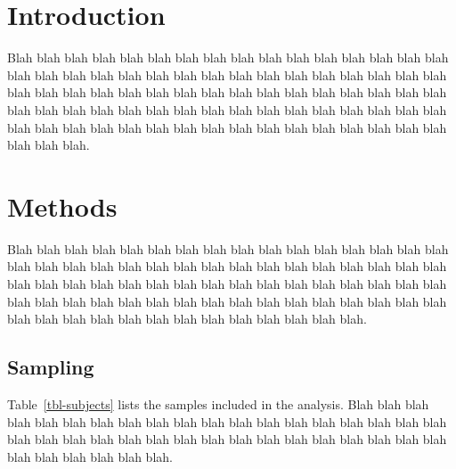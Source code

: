 \documentclass[
  a4paper,
]{scrbook}
\renewcommand*\contentsname{Table of contents}
\newcommand\contentsname{Table of contents}
\begin{document}
\renewcommand*\contentsname{Table of contents}
{
\setcounter{tocdepth}{1}
\tableofcontents
}

\mainmatter
\chapter{Introduction}\label{introduction}

Blah blah blah blah blah blah blah blah blah blah blah blah blah blah
blah blah blah blah blah blah blah blah blah blah blah blah blah blah
blah blah blah blah blah blah blah blah blah blah blah blah blah blah
blah blah blah blah blah blah blah blah blah blah blah blah blah blah
blah blah blah blah blah blah blah blah blah blah blah blah blah blah
blah blah blah blah blah blah blah blah blah blah blah blah blah.

\chapter{Methods}\label{methods}

Blah blah blah blah blah blah blah blah blah blah blah blah blah blah
blah blah blah blah blah blah blah blah blah blah blah blah blah blah
blah blah blah blah blah blah blah blah blah blah blah blah blah blah
blah blah blah blah blah blah blah blah blah blah blah blah blah blah
blah blah blah blah blah blah blah blah blah blah blah blah blah blah
blah blah blah blah blah blah blah.

\section{Sampling}\label{sampling}

Table~\ref{tbl-subjects} lists the samples included in the analysis.
Blah blah blah blah blah blah blah blah blah blah blah blah blah blah
blah blah blah blah blah blah blah blah blah blah blah blah blah blah
blah blah blah blah blah blah blah blah blah blah blah blah blah.
\end{document}
